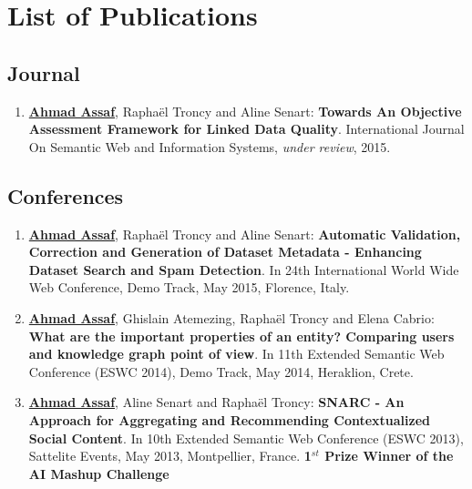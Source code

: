 \chapter*{List of Publications}

\section*{Journal}
\label{sec:journal}
\begin{enumerate}
 \item \underline{\textbf{Ahmad Assaf}}, {R}apha{\"e}l {T}roncy and {A}line {S}enart: \textbf{Towards An Objective Assessment Framework for Linked Data Quality}. International Journal On Semantic Web and Information Systems, \emph{under review}, 2015.
\end{enumerate}

\section*{Conferences}\label{sec:conf}
\begin{enumerate}

\item \underline{\textbf{Ahmad Assaf}}, {R}apha{\"e}l {T}roncy and {A}line {S}enart: \textbf{{A}utomatic Validation, Correction and Generation of Dataset Metadata - {E}nhancing Dataset Search and Spam Detection}. In 24th {I}nternational {W}orld {W}ide {W}eb {C}onference, Demo Track, May 2015, {F}lorence, {I}taly.
\item \underline{\textbf{Ahmad Assaf}}, {G}hislain {A}temezing, {R}apha{\"e}l {T}roncy and {E}lena {C}abrio: \textbf{{W}hat are the important properties of an entity? {C}omparing users and knowledge graph point of view}. In 11th {E}xtended {S}emantic {W}eb {C}onference (ESWC 2014), Demo Track, May 2014, {H}eraklion, {C}rete.
\item \underline{\textbf{Ahmad Assaf}}, {A}line {S}enart and {R}apha{\"e}l {T}roncy: \textbf{{SNARC} - An Approach for Aggregating and Recommending Contextualized Social Content}. In 10th {E}xtended {S}emantic {W}eb {C}onference (ESWC 2013), Sattelite Events, May 2013, {M}ontpellier, {F}rance. \textbf{1$^{st}$ Prize Winner of the AI Mashup Challenge}
\end{enumerate}

